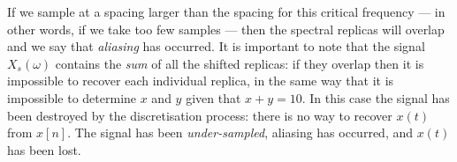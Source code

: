 \documentclass[10pt]{beamer}
\begin{document}
If we sample at a spacing larger than the spacing for this critical frequency --- in other words, if we take too few samples --- then the spectral replicas will overlap and we say that {\em aliasing} has occurred.  It is important to note that the signal $X_s(\omega)$ contains the {\em sum} of all the shifted replicas:  if they overlap then it is impossible to recover each individual replica, in the same way that it is impossible to determine $x$ and $y$ given that $x+y = 10$.  In this case the signal has been destroyed by the discretisation process:  there is no way to recover $x(t)$ from $x[n]$.  The signal has been {\em under-sampled}, aliasing has occurred, and $x(t)$ has been lost.
\end{document}
